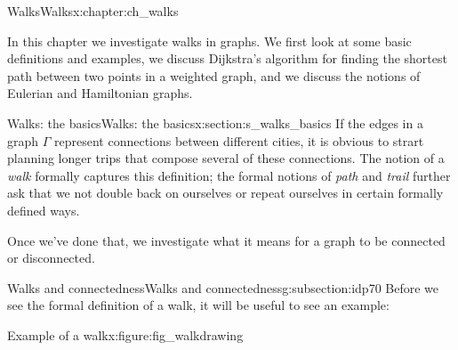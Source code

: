 \documentclass[oneside,10pt,]{book}
\numberwithin{equation}{section}
\begin{document}
\begin{chapterptx}{Walks}{}{Walks}{}{}{x:chapter:ch_walks}
\begin{introduction}{}%
In this chapter we investigate walks in graphs.  We first look at some basic definitions and examples, we discuss Dijkstra's algorithm for finding the shortest path between two points in a weighted graph, and we discuss the notions of Eulerian and Hamiltonian graphs.%
\end{introduction}%
%
%
\typeout{************************************************}
\typeout{************************************************}
%
\begin{sectionptx}{Walks: the basics}{}{Walks: the basics}{}{}{x:section:s_walks_basics}
If the edges in a graph \(\Gamma\) represent connections between different cities, it is obvious to strart planning longer trips that compose several of these connections.  The notion of a \emph{walk} formally captures this definition; the formal notions of \emph{path} and \emph{trail} further ask that we not double back on ourselves or repeat ourselves in certain formally defined ways.%
 \par
Once we've done that, we investigate what it means for a graph to be connected or disconnected.%
%
%
\typeout{************************************************}
\typeout{************************************************}
%
\begin{subsectionptx}{Walks and connectedness}{}{Walks and connectedness}{}{}{g:subsection:idp70}
Before we see the formal definition of a walk, it will be useful to see an example:%
\begin{figureptx}{Example of a walk}{x:figure:fig_walkdrawing}{}%
\begin{image}{0.15}{0.7}{0.15}%
\end{image}
\end{figureptx}
\end{subsectionptx}
\end{sectionptx}
\end{chapterptx}
\end{document}
